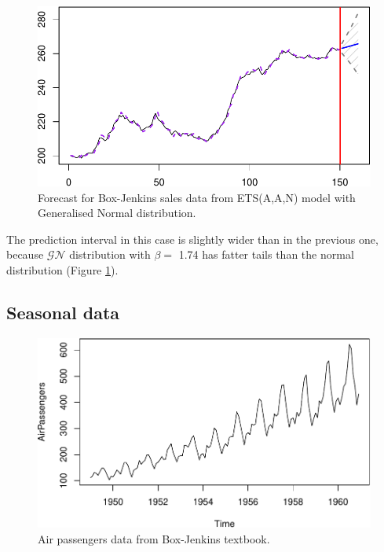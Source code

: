 \documentclass[
]{book}
\theoremstyle{definition}
\theoremstyle{definition}
\theoremstyle{definition}
\theoremstyle{definition}
\theoremstyle{remark}
\begin{document}
\begin{figure}
\centering
\includegraphics{Svetunkov--2022----ADAM_files/figure-latex/BJsalesAANForecastGN-1.pdf}
\caption{\label{fig:BJsalesAANForecastGN}Forecast for Box-Jenkins sales data from ETS(A,A,N) model with Generalised Normal distribution.}
\end{figure}

The prediction interval in this case is slightly wider than in the previous one, because \(\mathcal{GN}\) distribution with \(\beta=\) 1.74 has fatter tails than the normal distribution (Figure \ref{fig:BJsalesAANForecastGN}).

\hypertarget{ADAMETSPureAdditiveExamplesETSAAA}{%
\subsection{Seasonal data}\label{ADAMETSPureAdditiveExamplesETSAAA}}

\begin{figure}
\centering
\includegraphics{Svetunkov--2022----ADAM_files/figure-latex/AirPassengersPlot-1.pdf}
\caption{\label{fig:AirPassengersPlot}Air passengers data from Box-Jenkins textbook.}
\end{figure}
\end{document}
